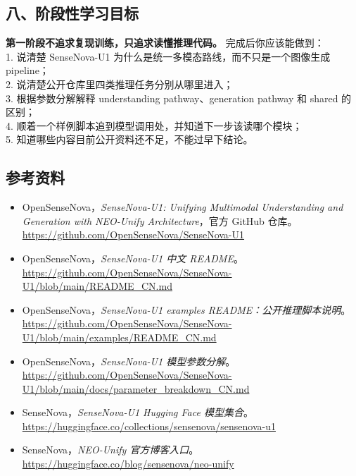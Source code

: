 \subsection{八、阶段性学习目标}

\begin{summarybox}
\textbf{第一阶段不追求复现训练，只追求读懂推理代码。} 完成后你应该能做到：\\
1. 说清楚 SenseNova-U1 为什么是统一多模态路线，而不只是一个图像生成 pipeline；\\
2. 说清楚公开仓库里四类推理任务分别从哪里进入；\\
3. 根据参数分解解释 understanding pathway、generation pathway 和 shared 的区别；\\
4. 顺着一个样例脚本追到模型调用处，并知道下一步该读哪个模块；\\
5. 知道哪些内容目前公开资料还不足，不能过早下结论。
\end{summarybox}

\subsection{参考资料}

\begingroup
\small
\sloppy
\begin{itemize}[leftmargin=1.5em]
  \item OpenSenseNova，\emph{SenseNova-U1: Unifying Multimodal Understanding and Generation with NEO-Unify Architecture}，官方 GitHub 仓库。\\
  \url{https://github.com/OpenSenseNova/SenseNova-U1}
  \item OpenSenseNova，\emph{SenseNova-U1 中文 README}。\\
  \url{https://github.com/OpenSenseNova/SenseNova-U1/blob/main/README_CN.md}
  \item OpenSenseNova，\emph{SenseNova-U1 examples README：公开推理脚本说明}。\\
  \url{https://github.com/OpenSenseNova/SenseNova-U1/blob/main/examples/README_CN.md}
  \item OpenSenseNova，\emph{SenseNova-U1 模型参数分解}。\\
  \url{https://github.com/OpenSenseNova/SenseNova-U1/blob/main/docs/parameter_breakdown_CN.md}
  \item SenseNova，\emph{SenseNova-U1 Hugging Face 模型集合}。\\
  \url{https://huggingface.co/collections/sensenova/sensenova-u1}
  \item SenseNova，\emph{NEO-Unify 官方博客入口}。\\
  \url{https://huggingface.co/blog/sensenova/neo-unify}
\end{itemize}
\endgroup

